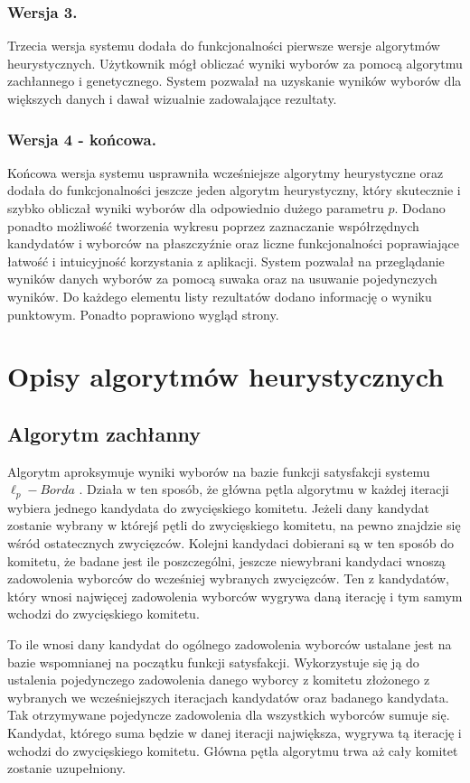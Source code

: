 \documentclass[polish,11pt]{aghthesis}
\begin{document}
\subsubsection{Wersja 3.}
Trzecia wersja systemu dodała do funkcjonalności pierwsze wersje algorytmów
heurystycznych. Użytkownik mógł obliczać wyniki wyborów za pomocą algorytmu
zachłannego i genetycznego. System pozwalał na uzyskanie wyników wyborów dla
większych danych i dawał wizualnie zadowalające rezultaty.

\subsubsection{Wersja 4 - końcowa.}
Końcowa wersja systemu usprawniła wcześniejsze algorytmy heurystyczne oraz dodała do
funkcjonalności jeszcze jeden algorytm heurystyczny, który skutecznie i szybko obliczał
wyniki wyborów dla odpowiednio dużego parametru $p$. Dodano ponadto możliwość tworzenia wykresu 
poprzez zaznaczanie współrzędnych kandydatów i wyborców na płaszczyźnie oraz liczne
funkcjonalności poprawiające łatwość i intuicyjność korzystania z aplikacji. System pozwalał
na przeglądanie wyników danych wyborów za pomocą suwaka oraz na usuwanie
pojedynczych wyników. Do każdego elementu listy rezultatów dodano informację o wyniku
punktowym. Ponadto poprawiono wygląd strony.

\newpage
\section{Opisy algorytmów heurystycznych}
\subsection{Algorytm zachłanny}
Algorytm aproksymuje wyniki wyborów na bazie funkcji satysfakcji systemu $\ell_p-Borda$ .
Działa w ten sposób, że główna pętla algorytmu w każdej iteracji wybiera jednego kandydata
do zwycięskiego komitetu. Jeżeli dany kandydat zostanie wybrany w którejś pętli do
zwycięskiego komitetu, na pewno znajdzie się wśród ostatecznych zwycięzców. Kolejni
kandydaci dobierani są w ten sposób do komitetu, że badane jest ile poszczególni, jeszcze
niewybrani kandydaci wnoszą zadowolenia wyborców do wcześniej wybranych zwycięzców.
Ten z kandydatów, który wnosi najwięcej zadowolenia wyborców wygrywa daną iterację i
tym samym wchodzi do zwycięskiego komitetu. 

To ile wnosi dany kandydat do ogólnego zadowolenia wyborców ustalane jest na bazie
wspomnianej na początku funkcji satysfakcji. Wykorzystuje się ją do ustalenia pojedynczego zadowolenia danego wyborcy z komitetu złożonego z wybranych we wcześniejszych
iteracjach kandydatów oraz badanego kandydata. Tak otrzymywane pojedyncze
zadowolenia dla wszystkich wyborców sumuje się. Kandydat, którego suma będzie w danej
iteracji największa, wygrywa tą iterację i wchodzi do zwycięskiego komitetu. Główna pętla
algorytmu trwa aż cały komitet zostanie uzupełniony.
\end{document}
